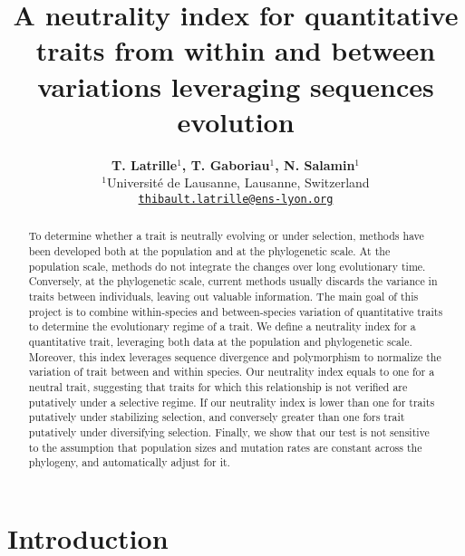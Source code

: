\documentclass{article}
\title{A neutrality index for quantitative traits from within and between variations leveraging sequences evolution}
\author{
\large
\textbf{T. {Latrille}$^{1}$, T. {Gaboriau}$^{1}$, N. {Salamin}$^{1}$}\\
\normalsize
$^{1}$Université de Lausanne, Lausanne, Switzerland\\
\texttt{\href{mailto:thibault.latrille@ens-lyon.org}{thibault.latrille@ens-lyon.org}} \\
}
\begin{document}
\maketitle

\begin{abstract}
    To determine whether a trait is neutrally evolving or under selection, methods have been developed both at the population and at the phylogenetic scale.
    At the population scale, methods do not integrate the changes over long evolutionary time.
    Conversely, at the phylogenetic scale, current methods usually discards the variance in traits between individuals, leaving out valuable information.
    The main goal of this project is to combine within-species and between-species variation of quantitative traits to determine the evolutionary regime of a trait.
    We define a neutrality index for a quantitative trait, leveraging both data at the population and phylogenetic scale.
    Moreover, this index leverages sequence divergence and polymorphism to normalize the variation of trait between and within species.
    Our neutrality index equals to one for a neutral trait, suggesting that traits for which this relationship is not verified are putatively under a selective regime.
    If our neutrality index is lower than one for traits putatively under stabilizing selection, and conversely greater than one fors trait putatively under diversifying selection.
    Finally, we show that our test is not sensitive to the assumption that population sizes and mutation rates are constant across the phylogeny, and automatically adjust for it.
\end{abstract}


\section{Introduction}\label{sec:introduction}
\end{document}
